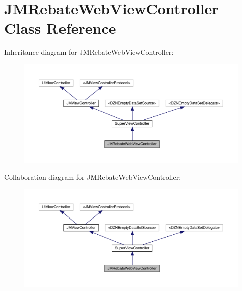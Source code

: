 \hypertarget{interface_j_m_rebate_web_view_controller}{}\section{J\+M\+Rebate\+Web\+View\+Controller Class Reference}
\label{interface_j_m_rebate_web_view_controller}


Inheritance diagram for J\+M\+Rebate\+Web\+View\+Controller\+:\nopagebreak
\begin{figure}[H]
\begin{center}
\leavevmode
\includegraphics[width=350pt]{interface_j_m_rebate_web_view_controller__inherit__graph}
\end{center}
\end{figure}


Collaboration diagram for J\+M\+Rebate\+Web\+View\+Controller\+:\nopagebreak
\begin{figure}[H]
\begin{center}
\leavevmode
\includegraphics[width=350pt]{interface_j_m_rebate_web_view_controller__coll__graph}
\end{center}
\end{figure}
